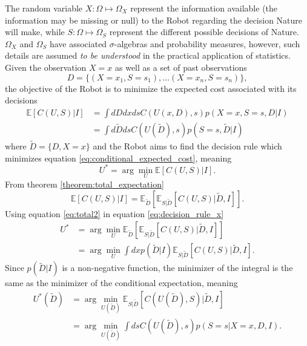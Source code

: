 The random variable $X: \Omega \mapsto \Omega_X$ represent the information available (the information may be missing or null) to the Robot regarding the decision Nature will make, while $S: \Omega \mapsto \Omega_S$ represent the different possible decisions of Nature. $\Omega_X$ and $\Omega_S$ have associated $\sigma$-algebras and probability measures, however, such details are assumed \emph{to be understood} in the practical application of statistics. Given the observation $X=x$ as well as a set of past observations
\begin{equation}
	D = \{(X=x_1,S=s_1),\dots (X=x_n,S=s_n)\},
\end{equation}
the objective of the Robot is to minimize the expected cost associated with its decisions~\cite{murphy2023probabilistic}
\begin{equation}
	\begin{split}
		\mathbb{E}[C(U, S)|I] &= \int dD dx ds  C(U(x,D),s) p(X=x,S=s,D|I)\\
		& = \int d\tilde{D} ds  C(U(\tilde{D}),s) p(S=s,\tilde{D}|I)
	\end{split}
	\label{eq:conditional_expected_cost}
\end{equation}
where $\tilde{D} = \{D,X= x\}$ and the Robot aims to find the decision rule which minimizes equation \eqref{eq:conditional_expected_cost}, meaning
\begin{equation}
	U^* = \arg\min_{U} \mathbb{E}[C(U, S)|I].
	\label{eq:decision_rule_x}
\end{equation}	
From theorem \ref{theorem:total_expectation}
\begin{equation}
	\mathbb{E}[C(U, S)|I] = \mathbb{E}_{\tilde{D}}[\mathbb{E}_{S|\tilde{D}}[C(U, S)|\tilde{D},I]].
	\label{eq:total2}
\end{equation}
Using equation \eqref{eq:total2} in equation \eqref{eq:decision_rule_x}
\begin{equation}
	\begin{split}
		U^* &= \arg\min_{U} \mathbb{E}_{\tilde{D}}[\mathbb{E}_{S|\tilde{D}}[C(U, S)|\tilde{D},I]]\\
		&= \arg\min_{U} \int dxp(\tilde{D}|I) \mathbb{E}_{S|\tilde{D}}[C(U, S)|\tilde{D},I].
	\end{split}
	\label{eq:decision_rule2}
\end{equation}
Since $p(\tilde{D}|I)$ is a non-negative function, the minimizer of the integral is the same as the minimizer of the conditional expectation, meaning
\begin{equation}
	\begin{split}
		U^*(\tilde{D}) &= \arg\min_{U(\tilde{D})} \mathbb{E}_{S|\tilde{D}}[C(U(\tilde{D}), S)|\tilde{D},I]\\
		& = \arg\min_{U(\tilde{D})}\int  ds C(U(\tilde{D}),s) p(S=s|X=x,D,I).
	\end{split}
	\label{eq:decision_rule3}
\end{equation}
